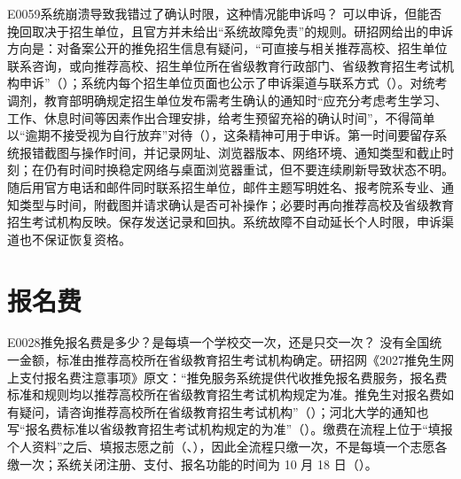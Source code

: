 \begin{qa}{E0059}{系统崩溃导致我错过了确认时限，这种情况能申诉吗？}
可以申诉，但能否挽回取决于招生单位，且官方并未给出“系统故障免责”的规则。研招网给出的申诉方向是：对备案公开的推免招生信息有疑问，“可直接与相关推荐高校、招生单位联系咨询，或向推荐高校、招生单位所在省级教育行政部门、省级教育招生考试机构申诉”（）；系统内每个招生单位页面也公示了申诉渠道与联系方式（）。对统考调剂，教育部明确规定招生单位发布需考生确认的通知时“应充分考虑考生学习、工作、休息时间等因素作出合理安排，给考生预留充裕的确认时间”，不得简单以“逾期不接受视为自行放弃”对待（），这条精神可用于申诉。第一时间要留存系统报错截图与操作时间，并记录网址、浏览器版本、网络环境、通知类型和截止时刻；在仍有时间时换稳定网络与桌面浏览器重试，但不要连续刷新导致状态不明。随后用官方电话和邮件同时联系招生单位，邮件主题写明姓名、报考院系专业、通知类型与时间，附截图并请求确认是否可补操作；必要时再向推荐高校及省级教育招生考试机构反映。保存发送记录和回执。系统故障不自动延长个人时限，申诉渠道也不保证恢复资格。
\end{qa}

\section{报名费}
\begin{qa}{E0028}{推免报名费是多少？是每填一个学校交一次，还是只交一次？}
没有全国统一金额，标准由推荐高校所在省级教育招生考试机构确定。研招网《2027推免生网上支付报名费注意事项》原文：“推免服务系统提供代收推免报名费服务，报名费标准和规则均以推荐高校所在省级教育招生考试机构规定为准。推免生对报名费如有疑问，请咨询推荐高校所在省级教育招生考试机构”（）；河北大学的通知也写“报名费标准以省级教育招生考试机构规定的为准”（）。缴费在流程上位于“填报个人资料”之后、填报志愿之前（、），因此全流程只缴一次，不是每填一个志愿各缴一次；系统关闭注册、支付、报名功能的时间为 10 月 18 日（）。
\end{qa}


